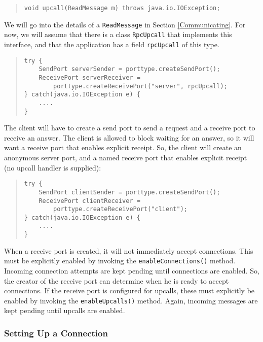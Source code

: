 \documentclass[10pt]{article}
\begin{document}
\begin{quote}
\begin{verbatim}
void upcall(ReadMessage m) throws java.io.IOException;
\end{verbatim}
\end{quote}

We will go into the details of a \texttt{ReadMessage} in Section
\ref{Communicating}. For now, we will assume that there is a
class \texttt{RpcUpcall} that implements this interface, and
that the application has a field \texttt{rpcUpcall} of this type.

\begin{quote}
\begin{verbatim}
try {
    SendPort serverSender = porttype.createSendPort();
    ReceivePort serverReceiver =
        porttype.createReceivePort("server", rpcUpcall);
} catch(java.io.IOException e) {
    ....
}
\end{verbatim}
\end{quote}

\noindent
The client will have to create a send port
to send a request and a receive port to receive an answer.
The client is allowed to block waiting for an answer, so it will
want a receive port that enables explicit receipt.
So, the client will create an anonymous server port, and a named
receive port that enables explicit receipt (no upcall handler is supplied):
\begin{quote}
\begin{verbatim}
try {
    SendPort clientSender = porttype.createSendPort();
    ReceivePort clientReceiver =
        porttype.createReceivePort("client");
} catch(java.io.IOException e) {
    ....
}
\end{verbatim}
\end{quote}

\noindent
When a receive port is created, it will not immediately accept connections.
This must be explicitly enabled by
invoking the \texttt{enableConnections()} method.
Incoming connection attempts are kept pending until connections are enabled.
So, the creator of
the receive port can determine when he is ready to accept connections.
If the receive port is configured for upcalls, these must
explicitly be enabled by invoking the \texttt{enableUpcalls()} method.
Again, incoming messages are kept pending until upcalls are enabled.

\subsubsection{Setting Up a Connection}
\end{document}
